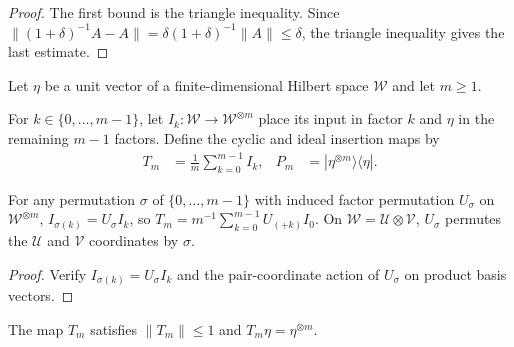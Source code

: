 \begin{proof}\leanok
    The first bound is the triangle inequality. Since
    $\lVert(1+\delta)^{-1}A-A\rVert=\delta(1+\delta)^{-1}\lVert A\rVert\le\delta$,
    the triangle inequality gives the last estimate.
\end{proof}

Let $\eta$ be a unit vector of a finite-dimensional Hilbert space $\mathcal W$
and let $m\ge1$.

\begin{definition}
    \label{def:peps_cyclic_insertion}
    \leanok
    For $k\in\{0,\dots,m-1\}$, let $I_k:\mathcal W\to\mathcal W^{\otimes m}$
    place its input in factor $k$ and $\eta$ in the remaining $m-1$ factors.
    Define the cyclic and ideal insertion maps by
    \begin{align}
        T_m & =\frac1m\sum_{k=0}^{m-1} I_k,          &
        P_m & =|\eta^{\otimes m}\rangle\langle\eta|.
        \label{eq:peps_cyclic_insertion}
    \end{align}
\end{definition}

\begin{lemma}
    \label{thm:peps_insertion_permutation}
    \leanok
    For any permutation $\sigma$ of $\{0,\dots,m-1\}$ with induced factor
    permutation $U_\sigma$ on $\mathcal W^{\otimes m}$, $I_{\sigma(k)}=U_\sigma I_k$,
    so $T_m=m^{-1}\sum_{k=0}^{m-1}U_{(+k)}I_0$. On
    $\mathcal W=\mathcal U\otimes\mathcal V$, $U_\sigma$ permutes the
    $\mathcal U$ and $\mathcal V$ coordinates by $\sigma$.
\end{lemma}

\begin{proof}\leanok
    Verify $I_{\sigma(k)}=U_\sigma I_k$ and the pair-coordinate action of
    $U_\sigma$ on product basis vectors.
\end{proof}

\begin{lemma}
    \label{thm:peps_cyclic_insertion_basic}
    \leanok
    The map $T_m$ satisfies $\|T_m\|\le 1$ and $T_m\eta=\eta^{\otimes m}$.
\end{lemma}

